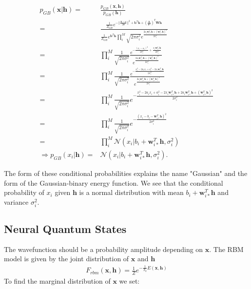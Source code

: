 \documentclass[%
oneside,                 %
final,                   %
10pt]{article}
\begin{document}
\begin{align}
	p_{GB} (\bm{x}|\bm{h})
	=& \frac{p_{GB} (\bm{x}, \bm{h})}{p_{GB} (\bm{h})} \nonumber \\
	=& \frac{\frac{1}{Z_{GB}} e^{-\vert\vert\frac{\bm{x} -\bm{a}}{2\bm{\sigma}}\vert\vert^2 + \bm{b}^T \bm{h} 
	+ (\frac{\bm{x}}{\bm{\sigma}^2})^T \bm{W}\bm{h}}}
	{\frac{1}{Z_{GB}} e^{\bm{b}^T \bm{h}} \prod_i^M
	\sqrt{2\pi \sigma_i^2}
	e^{\frac{2a_i \bm{w}_{i\ast}^T \bm{h} +(\bm{w}_{i\ast}^T \bm{h})^2 }{2\sigma_i^2}}}
	\nonumber \\
	=& \prod_i^M \frac{1}{\sqrt{2\pi \sigma_i^2}}
	\frac{e^{- \frac{(x_i - a_i)^2}{2\sigma_i^2} + \frac{x_i \bm{w}_{i\ast}^T \bm{h}}{2\sigma_i^2} }}
	{e^{\frac{2a_i \bm{w}_{i\ast}^T \bm{h} +(\bm{w}_{i\ast}^T \bm{h})^2 }{2\sigma_i^2}}}
	\nonumber \\
	=& \prod_i^M \frac{1}{\sqrt{2\pi \sigma_i^2}}
	\frac{e^{-\frac{x_i^2 - 2a_i x_i + a_i^2 - 2x_i \bm{w}_{i\ast}^T\bm{h} }{2\sigma_i^2} } }
	{e^{\frac{2a_i \bm{w}_{i\ast}^T \bm{h} +(\bm{w}_{i\ast}^T \bm{h})^2 }{2\sigma_i^2}}}
	\nonumber \\
	=& \prod_i^M \frac{1}{\sqrt{2\pi \sigma_i^2}}
	e^{- \frac{x_i^2 - 2a_i x_i + a_i^2 - 2x_i \bm{w}_{i\ast}^T\bm{h}
	+ 2a_i \bm{w}_{i\ast}^T \bm{h} +(\bm{w}_{i\ast}^T \bm{h})^2}
	{2\sigma_i^2} }
	\nonumber \\
	=& \prod_i^M \frac{1}{\sqrt{2\pi \sigma_i^2}}
	e^{ - \frac{(x_i - b_i - \bm{w}_{i\ast}^T \bm{h})^2}{2\sigma_i^2}} \nonumber \\
	=& \prod_i^M \mathcal{N}
	(x_i | b_i + \bm{w}_{i\ast}^T \bm{h}, \sigma_i^2) \\
	\Rightarrow p_{GB} (x_i|\bm{h}) =& \mathcal{N}
	(x_i | b_i + \bm{w}_{i\ast}^T \bm{h}, \sigma_i^2) .
\end{align}

The form of these conditional probabilities explains the name
"Gaussian" and the form of the Gaussian-binary energy function. We see
that the conditional probability of $x_i$ given $\bm{h}$ is a normal
distribution with mean $b_i + \bm{w}_{i\ast}^T \bm{h}$ and variance
$\sigma_i^2$.

\subsection*{Neural Quantum States}

The wavefunction should be a probability amplitude depending on $\bm{x}$. The RBM model is given by the joint distribution of $\bm{x}$ and $\bm{h}$
\begin{align}
	F_{rbm}(\bm{x},\mathbf{h}) = \frac{1}{Z} e^{-\frac{1}{T_0}E(\bm{x},\mathbf{h})}
\end{align}
To find the marginal distribution of $\bm{x}$ we set:
\end{document}

